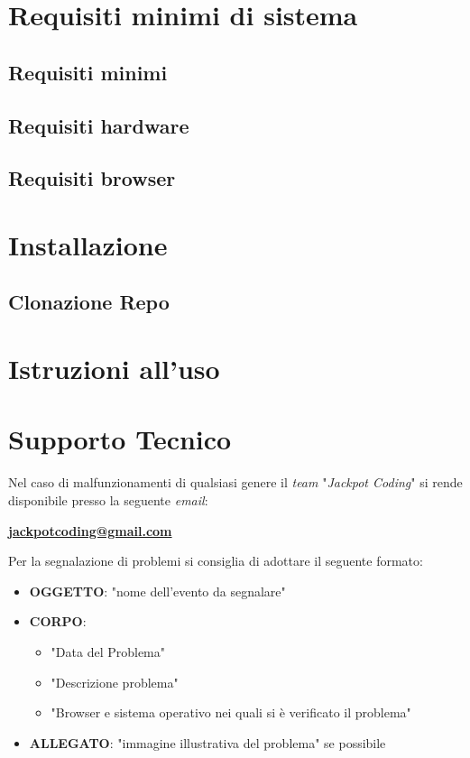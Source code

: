 \documentclass[5pt]{article}
\begin{document}
	\section{Requisiti minimi di sistema}
        \subsection{Requisiti minimi}
        \subsection{Requisiti hardware}
        \subsection{Requisiti browser}
	
	\section{Installazione}
        \subsection{Clonazione Repo}
 
        \section{Istruzioni all'uso}
        
        \section{Supporto Tecnico}
        Nel caso di malfunzionamenti di qualsiasi genere il \textit{team} "\textit{Jackpot Coding}" si rende disponibile presso la seguente \textit{email}:
        \begin{center}
        \textbf{\url{jackpotcoding@gmail.com}}
        \end{center}

        Per la segnalazione di problemi si consiglia di adottare il seguente formato:
\begin{itemize}
    \item \textbf{OGGETTO}: "nome dell'evento da segnalare"
    \item \textbf{CORPO}:
    \begin{itemize}
        \item "Data del Problema"
        \item "Descrizione problema"
        \item "Browser e sistema operativo nei quali si è verificato il problema"
    \end{itemize}
    \item \textbf{ALLEGATO}: "immagine illustrativa del problema" se possibile
\end{itemize}
        
        
        
			
\end{document}
